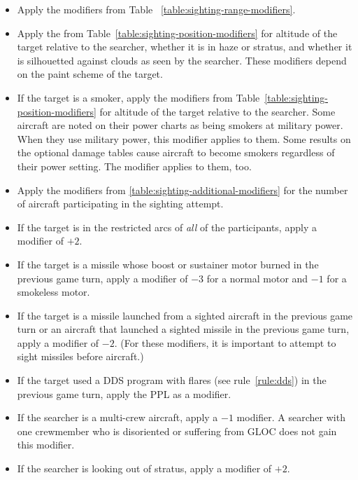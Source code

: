 {\begin{itemize}
    \item {} Apply the modifiers from Table ~\ref{table:sighting-range-modifiers}.
    \item {} Apply the from Table~\ref{table:sighting-position-modifiers} for altitude of the target relative to the searcher, whether it is in haze or stratus, and whether it is silhouetted against clouds as seen by the searcher. These modifiers depend on the paint scheme of the target.
    \item {} If the target is a smoker, apply the modifiers from Table~\ref{table:sighting-position-modifiers} for altitude of the target relative to the searcher. Some aircraft are noted on their power charts as being smokers at military power. When they use military power, this modifier applies to them. Some results on the optional damage tables cause aircraft to become smokers regardless of their power setting. The modifier applies to them, too.
    \item {} Apply the modifiers from \ref{table:sighting-additional-modifiers} for the number of aircraft participating in the sighting attempt. 
    \item {} If the target is in the restricted arcs of \emph{all} of the participants, apply a modifier of $+2$.
    \item {} If the target is a missile whose boost or sustainer motor burned in the previous game turn, apply a modifier of $-3$ for a normal motor and $-1$ for a smokeless motor.
    \item {} If the target is a missile launched from a sighted aircraft in the previous game turn or an aircraft that launched a sighted missile in the previous game turn, apply a modifier of $-2$. (For these modifiers, it is important to attempt to sight missiles before aircraft.)
    \item {} If the target used a DDS program with flares (see rule~\ref{rule:dds}) in the previous game turn, apply the PPL as a modifier.
    \item {} If the searcher is a multi-crew aircraft,    
    apply a $-1$ modifier. A searcher with one crewmember who is disoriented or suffering from GLOC does not gain this modifier.
    \item {} If the searcher is looking out of stratus, apply a modifier of $+2$.

\end{itemize}}
